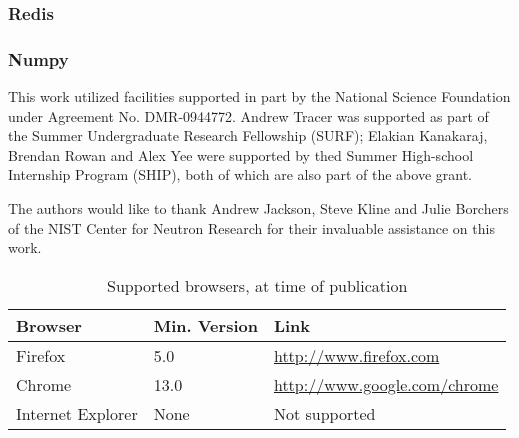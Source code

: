 \documentclass[pdf]{iucr}           %
\begin{document}
\subsubsection{Redis}

\subsubsection{Numpy}



This work utilized facilities supported in part by the National Science Foundation under Agreement No. DMR-0944772.
Andrew Tracer was supported as part of the Summer Undergraduate Research Fellowship (SURF);
Elakian Kanakaraj, Brendan Rowan and Alex Yee were supported by thed Summer High-school Internship Program (SHIP),
both of which are also part of the above grant.

The authors would like to thank Andrew Jackson, Steve Kline and Julie Borchers of the NIST Center for Neutron Research
for their invaluable assistance on this work.






\begin{table}
\caption{Supported browsers, at time of publication}
\label{table_browsers}
\begin{tabular}{lll}      %
 Browser    & Min. Version  &Link     \\
\hline
 Firefox      & 5.0      & \url{http://www.firefox.com}      \\
 Chrome      & 13.0      & \url{http://www.google.com/chrome}    \\
 Internet Explorer      & None      & Not supported      \\
\end{tabular}
\end{table}



\end{document}
